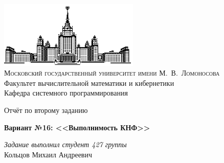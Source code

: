 \documentclass[12pt]{article}
\begin{document}
\newcommand{\anonsection}[1]{\section*{#1}\addcontentsline{toc}{section}{#1}}

\renewcommand\appendixname{Приложение}
\makeatletter
\def\redeflsection{\def\l@section{\@dottedtocline{1}{1.5em}{7.8em}}}
\renewcommand\appendix{\par
\setcounter{section}{0}%
\setcounter{subsection}{0}%
\def\@chapapp{\appendixname}%
\addtocontents{toc}{\protect\redeflsection}
\def\thesection{\appendixname\hspace{0.2cm}\@arabic\c@section}}
\makeatother



\thispagestyle{empty}

\begin{center}
\ \vspace{-3cm}

\includegraphics[width=0.5\textwidth]{msu.eps}\\

{\scshape Московский государственный университет имени М.~В.~Ломоносова}\\
Факультет вычислительной математики и кибернетики\\
Кафедра системного программирования

\vfill

{\LARGE Отчёт по второму заданию}

\vspace{1cm}

{\Huge\bfseries Вариант №16: <<Выполнимость КНФ>>} \\

\end{center}

\vspace{1cm}

\begin{flushright}
  \large
  \textit{Задание выполнил студент 427 группы}\\
  Кольцов Михаил Андреевич

\end{flushright}
\end{document}
